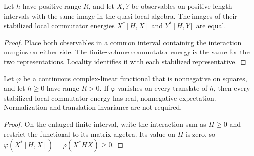 \begin{lemma}
    \label{thm:local_commutator_energy_representation}
    \leanok
    Let $h$ have positive range $R$, and let $X,Y$ be observables on positive-length
    intervals with the same image in the quasi-local algebra. The images of their
    stabilized local commutator energies $X^*[H,X]$ and $Y^*[H,Y]$ are equal.
\end{lemma}
\begin{proof}\leanok
    Place both observables in a common interval containing the interaction margins
    on either side. The finite-volume commutator energy is the same for the two
    representations. Locality identifies it with each stabilized representative.
\end{proof}

\begin{lemma}
    \label{thm:quasi_local_zero_energy_commutator_nonnegative}
    \leanok
    Let $\varphi$ be a continuous complex-linear functional that is nonnegative on
    squares, and let $h\geq0$ have range $R>0$. If $\varphi$ vanishes on every
    translate of $h$, then every stabilized local commutator energy has real,
    nonnegative expectation. Normalization and translation invariance are not
    required.
\end{lemma}
\begin{proof}\leanok
    On the enlarged finite interval, write the interaction sum as $H\geq0$ and
    restrict the functional to its matrix algebra. Its value on $H$ is zero, so
    $\varphi(X^*[H,X])=\varphi(X^*HX)\geq0$.
\end{proof}


